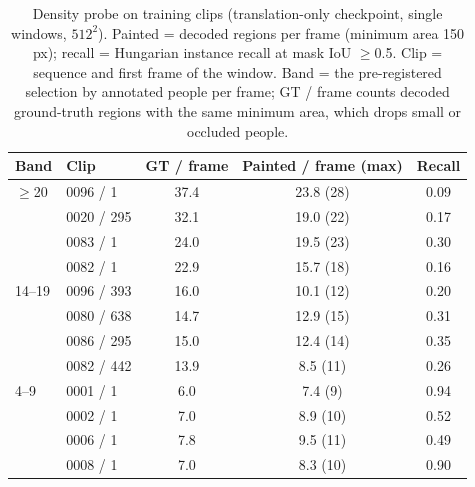 \documentclass{article} %
\newcommand{\rev}[1]{{\color{blue}#1}}
\begin{document}
\begin{table}[h]
\caption{\rev{Density probe on training clips (translation-only checkpoint, single windows,
$512^2$). Painted = decoded regions per frame (minimum area 150 px); recall = Hungarian
instance recall at mask IoU $\geq$0.5. Clip = sequence and first frame of the window. Band =
the pre-registered selection by annotated people per frame; GT / frame counts decoded
ground-truth regions with the same minimum area, which drops small or occluded people.}}
\label{tab:densetrain}
\begin{center}
\scriptsize
\begin{tabular}{llccc}
\toprule
\rev{Band} & \rev{Clip} & \rev{GT / frame} & \rev{Painted / frame (max)} & \rev{Recall} \\
\midrule
\rev{$\geq$20} & \rev{0096 / 1} & \rev{37.4} & \rev{23.8 (28)} & \rev{0.09} \\
 & \rev{0020 / 295} & \rev{32.1} & \rev{19.0 (22)} & \rev{0.17} \\
 & \rev{0083 / 1} & \rev{24.0} & \rev{19.5 (23)} & \rev{0.30} \\
 & \rev{0082 / 1} & \rev{22.9} & \rev{15.7 (18)} & \rev{0.16} \\
\rev{14--19} & \rev{0096 / 393} & \rev{16.0} & \rev{10.1 (12)} & \rev{0.20} \\
 & \rev{0080 / 638} & \rev{14.7} & \rev{12.9 (15)} & \rev{0.31} \\
 & \rev{0086 / 295} & \rev{15.0} & \rev{12.4 (14)} & \rev{0.35} \\
 & \rev{0082 / 442} & \rev{13.9} & \rev{8.5 (11)} & \rev{0.26} \\
\rev{4--9} & \rev{0001 / 1} & \rev{6.0} & \rev{7.4 (9)} & \rev{0.94} \\
 & \rev{0002 / 1} & \rev{7.0} & \rev{8.9 (10)} & \rev{0.52} \\
 & \rev{0006 / 1} & \rev{7.8} & \rev{9.5 (11)} & \rev{0.49} \\
 & \rev{0008 / 1} & \rev{7.0} & \rev{8.3 (10)} & \rev{0.90} \\
\bottomrule
\end{tabular}
\end{center}
\end{table}
\end{document}
